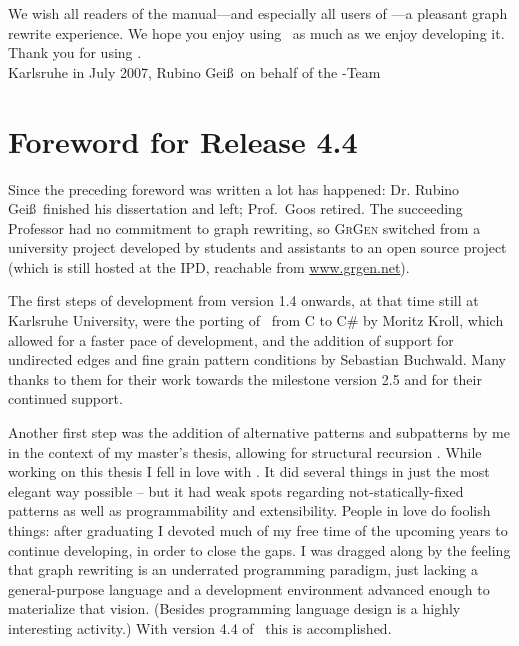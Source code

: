 We wish all readers of the manual---and especially all users of \GrG---a pleasant graph rewrite experience.
We hope you enjoy using \GrG\ as much as we enjoy developing it.\\[3ex]

Thank you for using \GrG.\\[6ex]

\noindent Karlsruhe in July 2007, Rubino Gei\ss~on behalf of the \GrG-Team

\pagebreak


\chapter*{Foreword for Release 4.4}

Since the preceding foreword was written a lot has happened: Dr. Rubino Gei\ss~finished his dissertation \cite{DissRuby} and left; Prof.\ Goos retired.
The succeeding Professor had no commitment to graph rewriting,
so \textsc{GrGen} switched from a university project developed by students and assistants
to an open source project (which is still hosted at the IPD, reachable from \url{www.grgen.net}).

The first steps of development from version 1.4 onwards, at that time still at Karlsruhe University, were the porting of \GrG\ from C to C\# \cite{Kro:07} by Moritz Kroll, which allowed for a faster pace of development,
and the addition of support for undirected edges and fine grain pattern conditions \cite{SABuchwald:2008} by Sebastian Buchwald.
Many thanks to them for their work towards the milestone version 2.5 \cite{ExpressiveConvenientFast:2010} and for their continued support. 

Another first step was the addition of alternative patterns and subpatterns by me in the context of my master's thesis, allowing for structural recursion \cite{Jak:08,StructuralRecursion}. 
While working on this thesis I fell in love with \GrG.
It did several things in just the most elegant way possible -- but it had weak spots regarding not-statically-fixed patterns as well as programmability and extensibility.
People in love do foolish things: after graduating I devoted much of my free time of the upcoming years to continue developing, in order to close the gaps.
I was dragged along by the feeling that graph rewriting is an underrated programming paradigm, just lacking a general-purpose language and a development environment advanced enough to materialize that vision. (Besides programming language design is a highly interesting activity.)
With version 4.4 of \GrG\ this is accomplished.\\[2ex]

